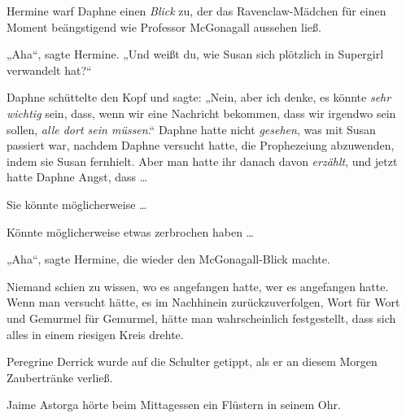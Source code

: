 Hermine warf Daphne einen \emph{Blick} zu, der das Ravenclaw-Mädchen für einen Moment beängstigend wie Professor McGonagall aussehen ließ.

„Aha“, sagte Hermine.
„Und weißt du, wie Susan sich plötzlich in Supergirl verwandelt hat?“

Daphne schüttelte den Kopf und sagte:
„Nein, aber ich denke, es könnte \emph{sehr wichtig} sein, dass, wenn wir eine Nachricht bekommen, dass wir irgendwo sein sollen, \emph{alle dort sein müssen}.“ Daphne hatte nicht \emph{gesehen}, was mit Susan passiert war, nachdem Daphne versucht hatte, die Prophezeiung abzuwenden, indem sie Susan fernhielt. Aber man hatte ihr danach davon \emph{erzählt}, und jetzt hatte Daphne Angst, dass …

Sie könnte möglicherweise …

Könnte möglicherweise etwas zerbrochen haben …

„Aha“, sagte Hermine, die wieder den McGonagall-Blick machte.

\later

Niemand schien zu wissen, wo es angefangen hatte, wer es angefangen hatte. Wenn man versucht hätte, es im Nachhinein zurückzuverfolgen, Wort für Wort und Gemurmel für Gemurmel, hätte man wahrscheinlich festgestellt, dass sich alles in einem riesigen Kreis drehte.

Peregrine Derrick wurde auf die Schulter getippt, als er an diesem Morgen Zaubertränke verließ.

Jaime Astorga hörte beim Mittagessen ein Flüstern in seinem Ohr.

